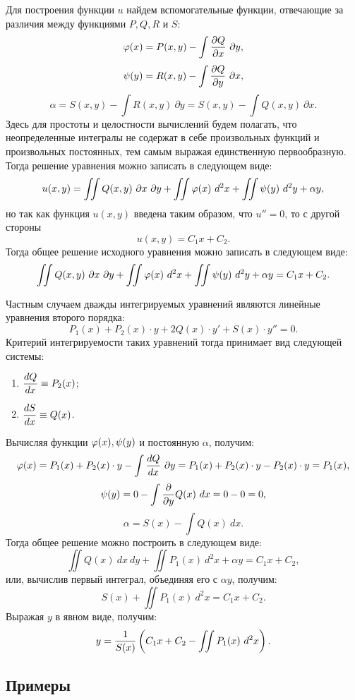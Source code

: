 	Для построения функции $u$ найдем вспомогательные функции, отвечающие за различия между функциями $P, Q, R$ и $S$:
	\[ \varphi(x) = P(x, y) - \int \dfrac{\partial Q}{\partial x} ~ \partial y, \]
	\[ \psi(y) = R(x, y) - \int \dfrac{\partial Q}{\partial y} ~ \partial x, \]
	\[ \alpha = S(x, y) - \int R(x, y) ~ \partial y = S(x, y) - \int Q(x, y) ~ \partial x. \]
	Здесь для простоты и целостности вычислений будем полагать, что неопределенные интегралы не содержат в себе произвольных функций и произвольных постоянных, тем самым выражая единственную первообразную. Тогда решение уравнения можно записать в следующем виде:
	\[ u(x, y) = \iint Q(x, y) ~ \partial x ~ \partial y + \iint \varphi(x) ~ d^2 x + \iint \psi(y) ~ d^2 y + \alpha y, \]
	но так как функция $u(x, y)$ введена таким образом, что $u'' = 0$, то с другой стороны
	\[ u(x, y) = C_1 x + C_2. \]
	Тогда общее решение исходного уравнения можно записать в следующем виде:
	\[ \iint Q(x, y) ~ \partial x ~ \partial y + \iint \varphi(x) ~ d^2 x + \iint \psi(y) ~ d^2 y + \alpha y = C_1 x + C_2. \]

	Частным случаем дважды интегрируемых уравнений являются линейные уравнения второго порядка:
	\[ P_1(x) + P_2(x) \cdot y + 2 Q(x) \cdot y' + S(x) \cdot y'' = 0. \]
	Критерий интегрируемости таких уравнений тогда принимает вид следующей системы:
	\begin{enumerate}
		\item \( \dfrac{d Q}{d x} \equiv P_2(x) \);
		\item \( \dfrac{d S}{d x} \equiv Q(x) \).
	\end{enumerate}
	Вычисляя функции $\varphi(x), \psi(y)$ и постоянную $\alpha$, получим:
	\[ \varphi(x) = P_1(x) + P_2(x) \cdot y - \int \dfrac{d Q}{d x} ~ \partial y = P_1(x) + P_2(x) \cdot y - P_2(x) \cdot y = P_1(x), \]
	\[ \psi(y) = 0 - \int \dfrac{\partial }{\partial y} Q(x) ~ dx = 0 - 0 = 0, \]
	\[ \alpha = S(x) - \int Q(x) ~ dx. \]
	Тогда общее решение можно построить в следующем виде:
	\[ \iint Q(x) ~ dx ~ dy + \iint P_1(x) ~ d^2 x + \alpha y = C_1 x + C_2, \]
	или, вычислив первый интеграл, объединяя его с $\alpha y$, получим:
	\[ S(x) + \iint P_1(x) ~ d^2 x = C_1 x + C_2. \]
	Выражая $y$ в явном виде, получим:
	\[ y = \frac{1}{S(x)} \left( C_1 x + C_2 - \iint P_1(x) ~ d^2 x \right). \]

	\subsection{Примеры}


